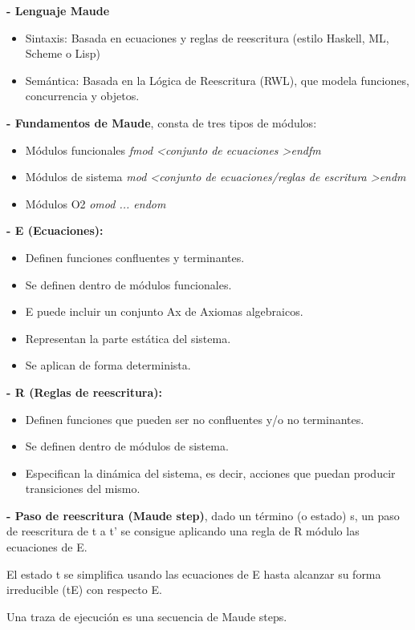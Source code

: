 \documentclass[12pt]{amsart}
\begin{document}
    \textbf{- Lenguaje Maude}

    \begin{itemize}
        \item Sintaxis: Basada en ecuaciones y reglas de reescritura
        (estilo Haskell, ML, Scheme o Lisp)
        \item Semántica: Basada en la Lógica de Reescritura (RWL), que
        modela funciones, concurrencia y objetos.
    \end{itemize}

    \textbf{- Fundamentos de Maude}, consta de tres tipos de módulos:

    \begin{itemize}
        \item Módulos funcionales \emph{fmod \textless conjunto de ecuaciones \textgreater endfm}
        \item Módulos de sistema \emph{mod \textless conjunto de ecuaciones/reglas de escritura \textgreater endm}
        \item Módulos O2 \emph{omod ... endom}
    \end{itemize}

    \textbf{- E (Ecuaciones):}
    \begin{itemize}
        \item Definen funciones confluentes y terminantes.
        \item Se definen dentro de módulos funcionales.
        \item E puede incluir un conjunto Ax de Axiomas algebraicos.
        \item Representan la parte estática del sistema.
        \item Se aplican de forma determinista.
    \end{itemize}

    \textbf{- R (Reglas de reescritura):}
    \begin{itemize}
        \item Definen funciones que pueden ser no confluentes y/o no
        terminantes.
        \item Se definen dentro de módulos de sistema.
        \item Especifican la dinámica del sistema, es decir, acciones que
        puedan producir transiciones del mismo.
    \end{itemize}

    \textbf{- Paso de reescritura (Maude step)}, dado un término (o estado) s,
    un paso de reescritura de t a t' se consigue aplicando una regla de R
    módulo las ecuaciones de E. 

    El estado t se simplifica usando las ecuaciones de E hasta
    alcanzar su forma irreducible (tE) con respecto E.

    Una traza de ejecución es una secuencia de Maude steps.
    
    
\end{document}
